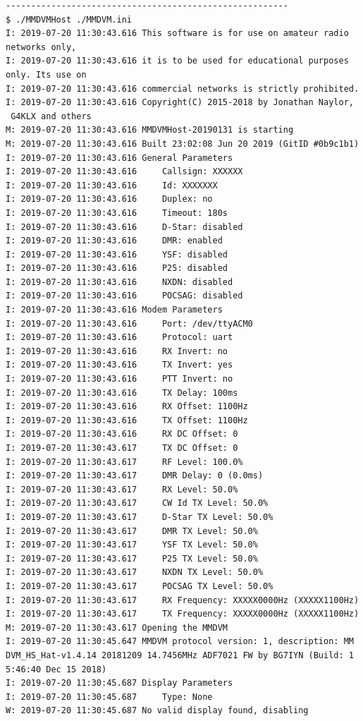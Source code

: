 \documentclass[a4j,oneside]{ujbook}
\begin{document}
\begin{verbatim}
--------------------------------------------------------
$ ./MMDVMHost ./MMDVM.ini
I: 2019-07-20 11:30:43.616 This software is for use on amateur radio 
networks only,
I: 2019-07-20 11:30:43.616 it is to be used for educational purposes 
only. Its use on
I: 2019-07-20 11:30:43.616 commercial networks is strictly prohibited.
I: 2019-07-20 11:30:43.616 Copyright(C) 2015-2018 by Jonathan Naylor,
 G4KLX and others
M: 2019-07-20 11:30:43.616 MMDVMHost-20190131 is starting
M: 2019-07-20 11:30:43.616 Built 23:02:08 Jun 20 2019 (GitID #0b9c1b1)
I: 2019-07-20 11:30:43.616 General Parameters
I: 2019-07-20 11:30:43.616     Callsign: XXXXXX
I: 2019-07-20 11:30:43.616     Id: XXXXXXX
I: 2019-07-20 11:30:43.616     Duplex: no
I: 2019-07-20 11:30:43.616     Timeout: 180s
I: 2019-07-20 11:30:43.616     D-Star: disabled
I: 2019-07-20 11:30:43.616     DMR: enabled
I: 2019-07-20 11:30:43.616     YSF: disabled
I: 2019-07-20 11:30:43.616     P25: disabled
I: 2019-07-20 11:30:43.616     NXDN: disabled
I: 2019-07-20 11:30:43.616     POCSAG: disabled
I: 2019-07-20 11:30:43.616 Modem Parameters
I: 2019-07-20 11:30:43.616     Port: /dev/ttyACM0
I: 2019-07-20 11:30:43.616     Protocol: uart
I: 2019-07-20 11:30:43.616     RX Invert: no
I: 2019-07-20 11:30:43.616     TX Invert: yes
I: 2019-07-20 11:30:43.616     PTT Invert: no
I: 2019-07-20 11:30:43.616     TX Delay: 100ms
I: 2019-07-20 11:30:43.616     RX Offset: 1100Hz
I: 2019-07-20 11:30:43.616     TX Offset: 1100Hz
I: 2019-07-20 11:30:43.616     RX DC Offset: 0
I: 2019-07-20 11:30:43.617     TX DC Offset: 0
I: 2019-07-20 11:30:43.617     RF Level: 100.0%
I: 2019-07-20 11:30:43.617     DMR Delay: 0 (0.0ms)
I: 2019-07-20 11:30:43.617     RX Level: 50.0%
I: 2019-07-20 11:30:43.617     CW Id TX Level: 50.0%
I: 2019-07-20 11:30:43.617     D-Star TX Level: 50.0%
I: 2019-07-20 11:30:43.617     DMR TX Level: 50.0%
I: 2019-07-20 11:30:43.617     YSF TX Level: 50.0%
I: 2019-07-20 11:30:43.617     P25 TX Level: 50.0%
I: 2019-07-20 11:30:43.617     NXDN TX Level: 50.0%
I: 2019-07-20 11:30:43.617     POCSAG TX Level: 50.0%
I: 2019-07-20 11:30:43.617     RX Frequency: XXXXX0000Hz (XXXXX1100Hz)
I: 2019-07-20 11:30:43.617     TX Frequency: XXXXX0000Hz (XXXXX1100Hz)
M: 2019-07-20 11:30:43.617 Opening the MMDVM
I: 2019-07-20 11:30:45.647 MMDVM protocol version: 1, description: MM
DVM_HS_Hat-v1.4.14 20181209 14.7456MHz ADF7021 FW by BG7IYN (Build: 1
5:46:40 Dec 15 2018)
I: 2019-07-20 11:30:45.687 Display Parameters
I: 2019-07-20 11:30:45.687     Type: None
W: 2019-07-20 11:30:45.687 No valid display found, disabling

\end{verbatim}
\end{document}
